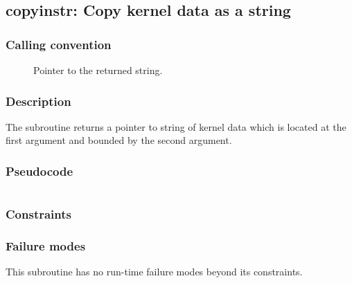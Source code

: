 \clearpage
{}
{}
\label{subr:copyinstr}
\subsection*{copyinstr: Copy kernel data as a string}

\subsubsection*{Calling convention}

\begin{description}
\item[] Pointer to the returned string.
\end{description}

\subsubsection*{Description}

The  subroutine returns a pointer to string of
kernel data which is located at the first argument and bounded by the
second argument.

\subsubsection*{Pseudocode}

\begin{verbatim}
\end{verbatim}

\subsubsection*{Constraints}

\subsubsection*{Failure modes}

This subroutine has no run-time failure modes beyond its constraints.
